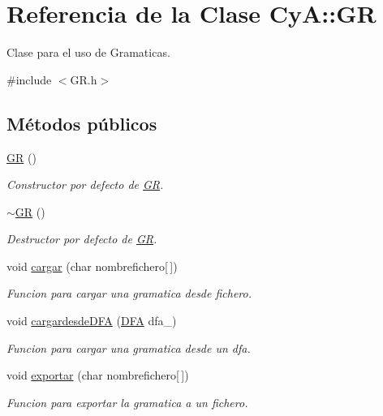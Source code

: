 \hypertarget{class_cy_a_1_1_g_r}{}\section{Referencia de la Clase CyA\+:\+:GR}
\label{class_cy_a_1_1_g_r}


Clase para el uso de Gramaticas.  




{\ttfamily \#include $<$G\+R.\+h$>$}

\subsection*{Métodos públicos}
\begin{DoxyCompactItemize}
\item 
\mbox{\hyperlink{class_cy_a_1_1_g_r_a9ff6c13befbda8a5f82ae9e30e976a2b}{GR}} ()
\begin{DoxyCompactList}\small\item\em Constructor por defecto de \mbox{\hyperlink{class_cy_a_1_1_g_r}{GR}}. \end{DoxyCompactList}\item 
\mbox{\hyperlink{class_cy_a_1_1_g_r_afad22fec67e373f85bce6860fd19e788}{$\sim$\+GR}} ()
\begin{DoxyCompactList}\small\item\em Destructor por defecto de \mbox{\hyperlink{class_cy_a_1_1_g_r}{GR}}. \end{DoxyCompactList}\item 
void \mbox{\hyperlink{class_cy_a_1_1_g_r_ae69828146c07258ec79c26fcc85b78f6}{cargar}} (char nombrefichero\mbox{[}$\,$\mbox{]})
\begin{DoxyCompactList}\small\item\em Funcion para cargar una gramatica desde fichero. \end{DoxyCompactList}\item 
void \mbox{\hyperlink{class_cy_a_1_1_g_r_a8d131c8d2a28fb5f949499b46336bab1}{cargardesde\+D\+FA}} (\mbox{\hyperlink{class_cy_a_1_1_d_f_a}{D\+FA}} dfa\+\_\+)
\begin{DoxyCompactList}\small\item\em Funcion para cargar una gramatica desde un dfa. \end{DoxyCompactList}\item 
void \mbox{\hyperlink{class_cy_a_1_1_g_r_a23ae98bf2b0df0b588bc84d7d645891f}{exportar}} (char nombrefichero\mbox{[}$\,$\mbox{]})
\begin{DoxyCompactList}\small\item\em Funcion para exportar la gramatica a un fichero. \end{DoxyCompactList}\end{DoxyCompactItemize}


